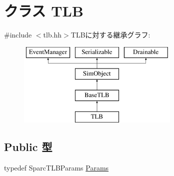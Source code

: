 \hypertarget{classSparcISA_1_1TLB}{
\section{クラス TLB}
\label{classSparcISA_1_1TLB}
}


{\ttfamily \#include $<$tlb.hh$>$}TLBに対する継承グラフ:\begin{figure}[H]
\begin{center}
\leavevmode
\includegraphics[height=4cm]{classSparcISA_1_1TLB}
\end{center}
\end{figure}
\subsection*{Public 型}
\begin{DoxyCompactItemize}
\item 
typedef SparcTLBParams \hyperlink{classSparcISA_1_1TLB_a3073524452e67556982db4c27c5f18ea}{Params}
\end{DoxyCompactItemize}
